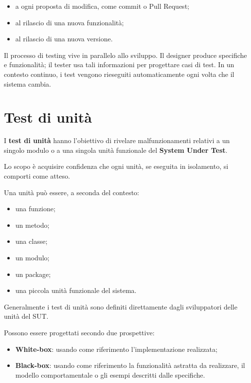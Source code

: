 \begin{itemize}
    \item a ogni proposta di modifica, come commit o Pull Request;
    \item al rilascio di una nuova funzionalità;
    \item al rilascio di una nuova versione.
\end{itemize}

\begin{notaprof}
Il processo di testing vive in parallelo allo sviluppo. Il designer produce specifiche e funzionalità; il tester usa tali informazioni per progettare casi di test. In un contesto continuo, i test vengono rieseguiti automaticamente ogni volta che il sistema cambia.
\end{notaprof}

\section{Test di unità}

I \textbf{test di unità} hanno l'obiettivo di rivelare malfunzionamenti relativi a un singolo modulo o a una singola unità funzionale del \textbf{System Under Test}.

Lo scopo è acquisire confidenza che ogni unità, se eseguita in isolamento, si comporti come atteso.

Una unità può essere, a seconda del contesto:

\begin{itemize}
    \item una funzione;
    \item un metodo;
    \item una classe;
    \item un modulo;
    \item un package;
    \item una piccola unità funzionale del sistema.
\end{itemize}

Generalmente i test di unità sono definiti direttamente dagli sviluppatori delle unità del SUT.

Possono essere progettati secondo due prospettive:

\begin{itemize}
    \item \textbf{White-box}: usando come riferimento l'implementazione realizzata;
    \item \textbf{Black-box}: usando come riferimento la funzionalità astratta da realizzare, il modello comportamentale o gli esempi descritti dalle specifiche.
\end{itemize}

